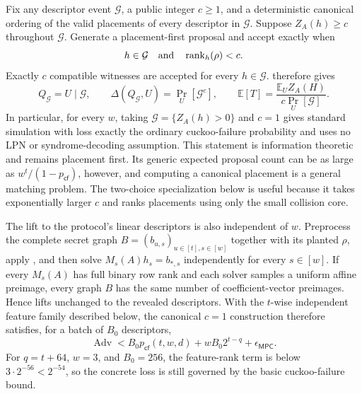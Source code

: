 Fix any descriptor event $\mathcal G$, a public integer $c\geq1$, and a
deterministic canonical ordering of the valid placements of every descriptor
in $\mathcal G$.  Suppose $Z_A(h)\geq c$ throughout $\mathcal G$.  Generate a
placement-first proposal and accept exactly when
\begin{equation}\label{eq:rev-cuckoo-general-rank-test}
 h\in\mathcal G
 \quad\textnormal{and}\quad
 \operatorname{rank}_h(\rho)<c.
\end{equation}
Exactly $c$ compatible witnesses are accepted for every $h\in\mathcal G$.
 therefore gives
\begin{equation}\label{eq:rev-cuckoo-general-debias}
 Q_{\mathcal G}=U\mid\mathcal G,
 \qquad
 \Delta(Q_{\mathcal G},U)=\Pr_U[\mathcal G^c],
 \qquad
 \mathbb E[T]=\frac{\mathbb E_U Z_A(H)}
                         {c\Pr_U[\mathcal G]}.
\end{equation}
In particular, for every $w$, taking
$\mathcal G=\{Z_A(h)>0\}$ and $c=1$ gives standard simulation with loss
exactly the ordinary cuckoo-failure probability and uses no LPN or
syndrome-decoding assumption.  This statement is information theoretic and
remains placement first.  Its generic expected proposal count can be as large
as $w^t/(1-p_{\mathsf{cf}})$, however, and computing a canonical placement is
a general matching problem.  The two-choice specialization below is useful
because it takes exponentially larger $c$ and ranks placements using only the
small collision core.

The lift to the protocol's linear descriptors is also independent of $w$.
Preprocess the complete secret graph
$B=(b_{u,s})_{u\in[t],s\in[w]}$ together with its planted $\rho$, apply
, and then solve
$M_s(A)h_s=b_{*,s}$ independently for every $s\in[w]$.  If every $M_s(A)$ has
full binary row rank and each solver samples a uniform affine preimage, every
graph $B$ has the same number of coefficient-vector preimages.  Hence
 lifts unchanged to the revealed
descriptors.  With the $t$-wise independent feature family described below,
the canonical $c=1$ construction therefore satisfies, for a batch of $B_0$
descriptors,
\begin{equation}\label{eq:rev-cuckoo-general-security}
 \operatorname{Adv}
 <B_0p_{\mathsf{cf}}(t,w,d)
   +wB_0 2^{t-q}+\epsilon_{\mathsf{MPC}}.
\end{equation}
For $q=t+64$, $w=3$, and $B_0=256$, the feature-rank term is below
$3\cdot2^{-56}<2^{-54}$, so the concrete loss is still governed by the basic
cuckoo-failure bound.

